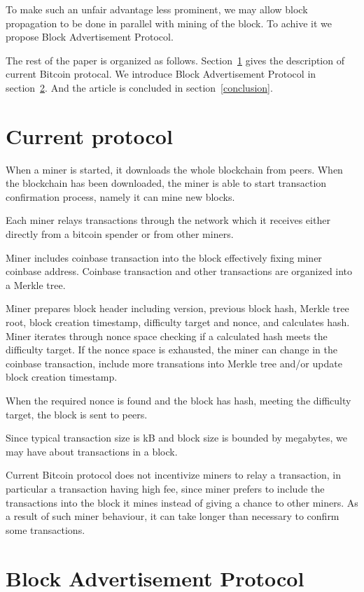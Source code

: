 \documentclass[12pt]{elsarticle}
\begin{document}
To make such an unfair advantage less prominent, we may allow block propagation to be done in parallel with mining of the block. To achive it we propose Block Advertisement Protocol.

The rest of the paper is organized as follows. Section~\ref{current_protocol} gives the description of current Bitcoin protocal. We introduce Block Advertisement Protocol in section~\ref{advertisement_protocol}. And the article is concluded in section~\ref{conclusion}.

\section{Current protocol}
\label{current_protocol}

When a miner is started, it downloads the whole blockchain from peers. When the blockchain has been downloaded, the miner is able to start transaction confirmation process, namely it can mine new blocks.

Each miner relays transactions through the network which it receives either directly from a bitcoin spender or from other miners.

Miner includes coinbase transaction into the block effectively fixing miner coinbase address. Coinbase transaction and other transactions are organized into a Merkle tree.

Miner prepares block header including version, previous block hash, Merkle tree root, block creation timestamp, difficulty target and nonce, and calculates hash. Miner iterates through nonce space checking if a calculated hash meets the difficulty target. If the nonce space is exhausted, the miner can change  in the coinbase transaction, include more transations into Merkle tree and/or update block creation timestamp.

When the required nonce is found and the block has hash, meeting the difficulty target, the block is sent to peers.

Since typical transaction size is kB and block size is bounded by  megabytes, we may have about  transactions in a block.

Current Bitcoin protocol does not incentivize miners to relay a transaction, in particular a transaction having high fee, since miner prefers to include the transactions into the block it mines instead of giving a chance to other miners. As a result of such miner behaviour, it can take longer than necessary to confirm some transactions.

\section{Block Advertisement Protocol}
\label{advertisement_protocol}
\end{document}
